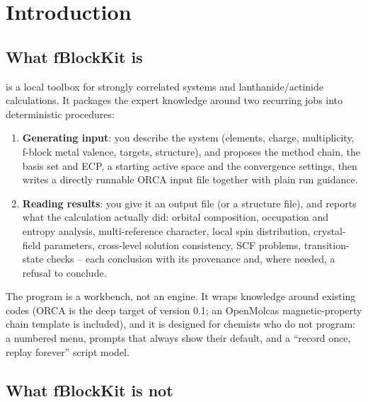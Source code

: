 \chapter{Introduction}
\label{ch:introduction}

\section{What fBlockKit is}

\fbk{} is a local toolbox for strongly correlated systems and
lanthanide/actinide calculations. It packages the expert knowledge around two
recurring jobs into deterministic procedures:

\begin{enumerate}
  \item \textbf{Generating input}: you describe the system (elements, charge,
    multiplicity, f-block metal valence, targets, structure), and \fbk{}
    proposes the method chain, the basis set and ECP, a starting active space
    and the convergence settings, then writes a directly runnable ORCA input
    file together with plain run guidance.
  \item \textbf{Reading results}: you give it an output file (or a structure
    file), and \fbk{} reports what the calculation actually did: orbital
    composition, occupation and entropy analysis, multi-reference character,
    local spin distribution, crystal-field parameters, cross-level solution
    consistency, SCF problems, transition-state checks -- each conclusion with
    its provenance and, where needed, a refusal to conclude.
\end{enumerate}

The program is a workbench, not an engine. It wraps knowledge around existing
codes (ORCA is the deep target of version 0.1; an OpenMolcas magnetic-property
chain template is included), and it is designed for chemists who do not
program: a numbered menu, prompts that always show their default, and a
``record once, replay forever'' script model.

\section{What fBlockKit is not}

